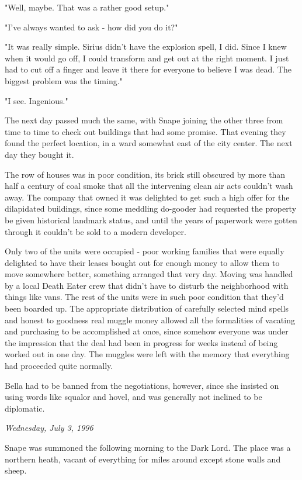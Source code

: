 \documentclass[a4paper,11pt]{article}
\begin{document}
"Well, maybe. That was a rather good setup."

"I've always wanted to ask - how did you do it?"

"It was really simple. Sirius didn't have the explosion spell, I did. Since I knew when it would go off, I could transform and get out at the right moment. I just had to cut off a finger and leave it there for everyone to believe I was dead. The biggest problem was the timing."

"I see. Ingenious."

The next day passed much the same, with Snape joining the other three from time to time to check out buildings that had some promise. That evening they found the perfect location, in a ward somewhat east of the city center. The next day they bought it.

The row of houses was in poor condition, its brick still obscured by more than half a century of coal smoke that all the intervening clean air acts couldn't wash away. The company that owned it was delighted to get such a high offer for the dilapidated buildings, since some meddling do-gooder had requested the property be given historical landmark status, and until the years of paperwork were gotten through it couldn't be sold to a modern developer.

Only two of the units were occupied - poor working families that were equally delighted to have their leases bought out for enough money to allow them to move somewhere better, something arranged that very day. Moving was handled by a local Death Eater crew that didn't have to disturb the neighborhood with things like vans. The rest of the units were in such poor condition that they'd been boarded up. The appropriate distribution of carefully selected mind spells and honest to goodness real muggle money allowed all the formalities of vacating and purchasing to be accomplished at once, since somehow everyone was under the impression that the deal had been in progress for weeks instead of being worked out in one day. The muggles were left with the memory that everything had proceeded quite normally.

Bella had to be banned from the negotiations, however, since she insisted on using words like squalor and hovel, and was generally not inclined to be diplomatic.

\emph{Wednesday, July 3, 1996}

Snape was summoned the following morning to the Dark Lord. The place was a northern heath, vacant of everything for miles around except stone walls and sheep.
\end{document}
